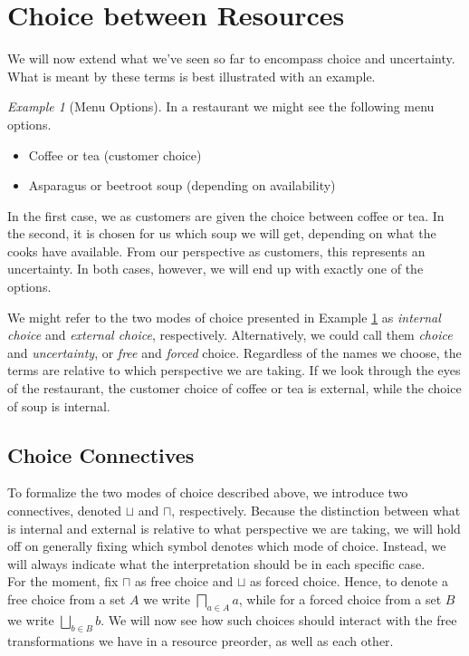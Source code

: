 \documentclass[12pt]{article}
\theoremstyle{definition}
\theoremstyle{plain}
\theoremstyle{plain}
\theoremstyle{plain}
\theoremstyle{plain}
\theoremstyle{remark}
\newtheorem{example}{Example}[section]
\theoremstyle{remark}
\begin{document}
\section{Choice between Resources}
We will now extend what we've seen so far to encompass choice and uncertainty. What is meant by these terms is best illustrated with an example.

\begin{example}[Menu Options]\label{ex:menu}
	In a restaurant we might see the following menu options.
	\begin{itemize}
		\item Coffee or tea (customer choice)
		\item Asparagus or beetroot soup (depending on availability)
	\end{itemize}
	In the first case, we as customers are given the choice between coffee or tea. In the second, it is chosen for us which soup we will get, depending on what the cooks have available. From our perspective as customers, this represents an uncertainty. In both cases, however, we will end up with exactly one of the options.
\end{example}

We might refer to the two modes of choice presented in Example \ref{ex:menu} as \emph{internal choice} and \emph{external choice}, respectively. Alternatively, we could call them \emph{choice} and \emph{uncertainty}, or \emph{free} and \emph{forced} choice. Regardless of the names we choose, the terms are relative to which perspective we are taking. If we look through the eyes of the restaurant, the customer choice of coffee or tea is external, while the choice of soup is internal.

\subsection{Choice Connectives}
To formalize the two modes of choice described above, we introduce two connectives, denoted  $\sqcup$ and $\sqcap$, respectively. Because the distinction between what is internal and external is relative to what perspective we are taking, we will hold off on generally fixing which symbol denotes which mode of choice. Instead, we will always indicate what the interpretation should be in each specific case. \\

For the moment, fix $\sqcap$ as free choice and $\sqcup$ as forced choice. Hence, to  denote a free choice from a set $A$ we write $\bigsqcap_{a \in A} a$, while for a forced choice from a set $B$ we write $\bigsqcup_{b \in B} b$. We will now see how such choices should interact with the free transformations we have in a resource preorder, as well as each other.
\end{document}
